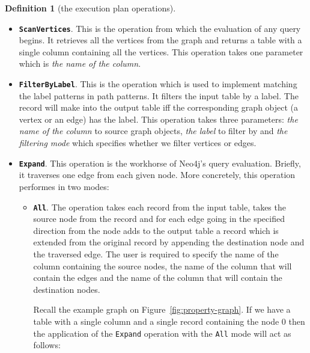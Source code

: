 \documentclass[14pt]{constructor-thesis}
\theoremstyle{definition}
\newtheorem*{definition}{Definition}
\begin{document}
\begin{definition}[the execution plan operations] $ $
  \begin{itemize}
    \item \textbf{\texttt{ScanVertices}}. This is the operation from which the evaluation of any query begins. It retrieves all the vertices from the graph and returns a table with a single column containing all the vertices. This operation takes one parameter which is \textit{the name of the column}. 

    \item \textbf{\texttt{FilterByLabel}}. This is the operation which is used to implement matching the label patterns in path patterns.
    It filters the input table by a label. The record will make into the output table iff the corresponding graph object (a vertex or an edge) has the label. This operation takes three parameters: \textit{the name of the column} to source graph objects, \textit{the label} to filter by and \textit{the filtering mode} which specifies whether we filter vertices or edges.

    \item \textbf{\texttt{Expand}}. This operation is the workhorse of Neo4j's query evaluation. Briefly, it traverses one edge from each given node. More concretely, this operation performes in two modes:
    \begin{itemize}
      \item \textbf{\texttt{All}}.
      The operation takes each record from the input table, takes the source node from the record and for each edge going in the specified direction from the node adds to the output table a record which is extended from the original record by appending the destination node and the traversed edge. The user is required to specify the name of the column containing the source nodes, the name of the column that will contain the edges and the name of the column that will contain the destination nodes.

      Recall the example graph on Figure~\ref{fig:property-graph}. If we have a table with a single column and a single record containing the node 0 then the application of the \texttt{Expand} operation with the \texttt{All} mode will act as follows:


\end{itemize}
\end{itemize}
\end{definition}
\end{document}
